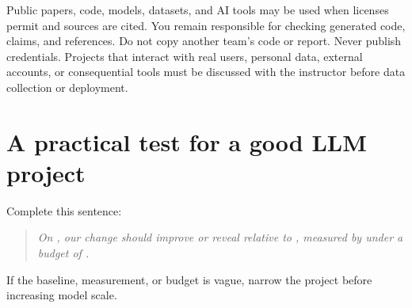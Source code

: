 \documentclass[11pt]{article}
\begin{document}
Public papers, code, models, datasets, and AI tools may be used when licenses permit and sources are cited. You remain responsible for checking generated code, claims, and references. Do not copy another team's code or report. Never publish credentials. Projects that interact with real users, personal data, external accounts, or consequential tools must be discussed with the instructor before data collection or deployment.

\section{A practical test for a good LLM project}

Complete this sentence:

\begin{quote}
\emph{On \underline{\hspace{2.6cm}}, our change \underline{\hspace{3.0cm}} should improve or reveal \underline{\hspace{2.8cm}} relative to \underline{\hspace{2.6cm}}, measured by \underline{\hspace{2.8cm}} under a budget of \underline{\hspace{2.2cm}}.}
\end{quote}

If the baseline, measurement, or budget is vague, narrow the project before increasing model scale.
\end{document}
